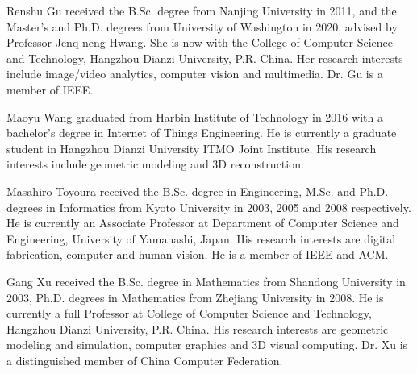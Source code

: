 \documentclass[journal]{IEEEtran}
\begin{document}
\begin{IEEEbiography}{Renshu Gu}
received the B.Sc. degree from Nanjing University in 2011, and the Master's and Ph.D. degrees from University of Washington in 2020, advised by Professor Jenq-neng Hwang. She is now with the College of Computer Science and Technology, Hangzhou Dianzi University, P.R. China. Her research interests include image/video analytics, computer vision and multimedia. Dr. Gu is a member of IEEE.
\end{IEEEbiography}


\begin{IEEEbiography}{Maoyu Wang} graduated from Harbin Institute of Technology in 2016 with a bachelor's degree in Internet of Things Engineering. He is currently a graduate student in Hangzhou Dianzi University ITMO Joint Institute. His research interests include geometric modeling and 3D reconstruction.
\end{IEEEbiography}

\begin{IEEEbiography}{Masahiro Toyoura}
received the B.Sc. degree in Engineering, M.Sc. and Ph.D. degrees in Informatics from Kyoto University in 2003, 2005 and 2008 respectively. 
He is currently an Associate Professor at Department of Computer Science and Engineering, University of Yamanashi, Japan. 
His research interests are digital fabrication, computer and human vision. He is a member of IEEE and ACM.
\end{IEEEbiography}

\begin{IEEEbiography}{Gang Xu}
received the B.Sc. degree in Mathematics from Shandong University in 2003,  Ph.D. degrees in Mathematics from Zhejiang University in 2008. 
He is currently a full Professor at College of Computer Science and Technology, Hangzhou Dianzi University, P.R. China.
His research interests are geometric modeling and simulation, computer graphics and 3D visual computing. Dr. Xu is a distinguished member of China Computer Federation. 
\end{IEEEbiography}



\end{document}
